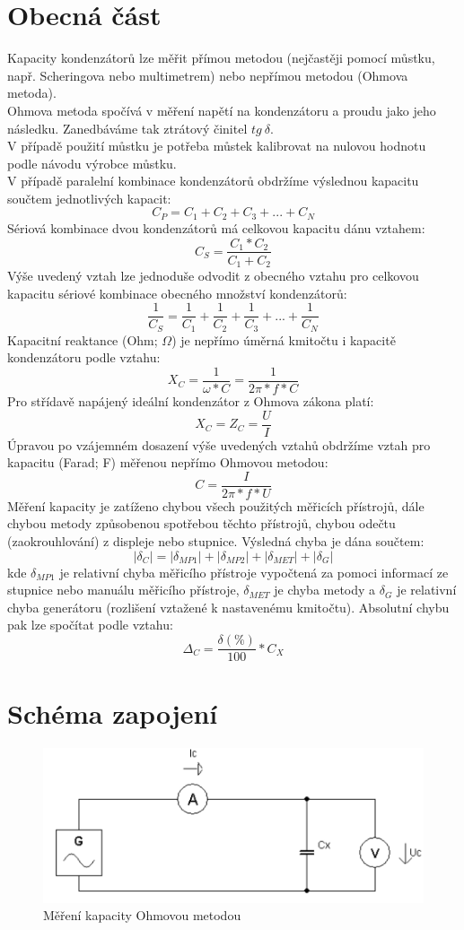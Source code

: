 \documentclass[a4paper,12pt]{report}
\begin{document}
\chapter*{Obecná část}
Kapacity kondenzátorů lze měřit přímou metodou (nejčastěji pomocí můstku, např. Scheringova nebo multimetrem) nebo nepřímou metodou (Ohmova metoda).\\
Ohmova metoda spočívá v měření napětí na kondenzátoru a proudu jako jeho následku.
Zanedbáváme tak ztrátový činitel $tg \ \delta$.\\
V případě použití můstku je potřeba můstek kalibrovat na nulovou hodnotu podle návodu výrobce můstku.\\
V případě paralelní kombinace kondenzátorů obdržíme výslednou kapacitu součtem jednotlivých kapacit:
$$C_P = C_1+C_2+C_3+...+C_N$$
Sériová kombinace dvou kondenzátorů má celkovou kapacitu dánu vztahem:
$$C_S = \frac{C_1*C_2}{C_1+C_2}$$
Výše uvedený vztah lze jednoduše odvodit z obecného vztahu pro celkovou kapacitu sériové kombinace obecného množství kondenzátorů:
$$\frac{1}{C_S} = \frac{1}{C_1}+\frac{1}{C_2}+\frac{1}{C_3}+...+\frac{1}{C_N}$$
Kapacitní reaktance (Ohm; $\Omega$) je nepřímo úměrná kmitočtu i kapacitě kondenzátoru podle vztahu:
$$X_C = \frac{1}{\omega*C} = \frac{1}{2\pi*f*C}$$
Pro střídavě napájený ideální kondenzátor z Ohmova zákona platí:
$$X_C=Z_C=\frac{U}{I}$$
Úpravou po vzájemném dosazení výše uvedených vztahů obdržíme vztah pro kapacitu (Farad; F) měřenou nepřímo Ohmovou metodou:
$$C = \frac{I}{2\pi*f*U}$$
Měření kapacity je zatíženo chybou všech použitých měřicích přístrojů, dále chybou metody způsobenou spotřebou těchto přístrojů, chybou odečtu (zaokrouhlování) z displeje nebo stupnice. Výsledná chyba je dána součtem:
$$|\delta_C|=|\delta_{MP1}|+|\delta_{MP2}|+|\delta_{MET}|+|\delta_{G}|$$
kde $\delta_{MP1}$ je relativní chyba měřicího přístroje vypočtená za pomoci informací ze stupnice nebo manuálu měřicího přístroje, $\delta_{MET}$ je chyba metody a $\delta_G$ je relativní chyba generátoru (rozlišení vztažené k nastavenému kmitočtu).
Absolutní chybu pak lze spočítat podle vztahu:
$$\Delta_C=\frac{\delta(\%)}{100}*C_X$$
\newpage
\chapter*{Schéma zapojení}
\begin{figure}[htp]
	\begin{center}
		\includegraphics[scale=0.5]{ELM_27_11_23@2.png}
		\caption{Měření kapacity Ohmovou metodou}
	\end{center}
\end{figure}
\newpage
\end{document}
